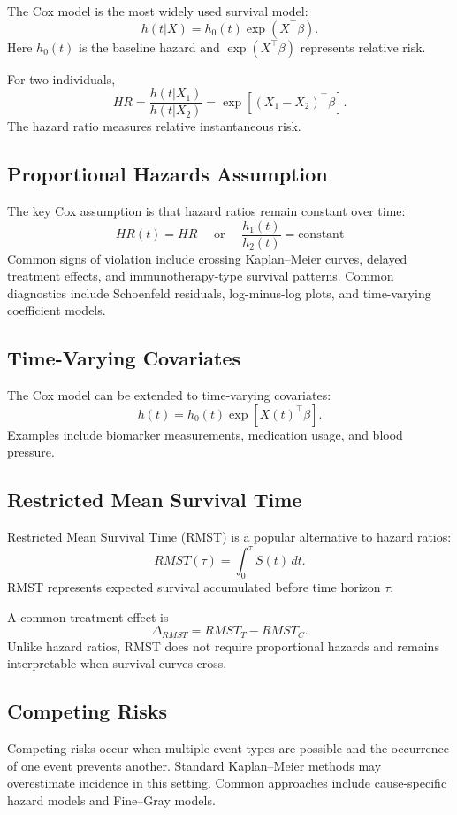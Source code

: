 \documentclass[11pt]{article}
\begin{document}
The Cox model is the most widely used survival model:
\[h(t|X)=h_0(t)\exp(X^\top\beta).\]
Here $h_0(t)$ is the baseline hazard and $\exp(X^\top\beta)$ represents relative risk.

For two individuals,\[HR=\frac{h(t|X_1)}{h(t|X_2)}=\exp[(X_1-X_2)^\top\beta].\]
The hazard ratio measures relative instantaneous risk.

\subsection*{Proportional Hazards Assumption}

The key Cox assumption is that hazard ratios remain constant over time: 
\[HR(t)=HR \quad \text{ or } \quad \frac{h_1(t)}{h_2(t)}=\text{constant}\]
Common signs of violation include crossing Kaplan--Meier curves, delayed treatment effects, and immunotherapy-type survival patterns. Common diagnostics include Schoenfeld residuals, log-minus-log plots, and time-varying coefficient models.

\subsection*{Time-Varying Covariates}

The Cox model can be extended to time-varying covariates:
\[h(t)=h_0(t)\exp[X(t)^\top\beta].\]
Examples include biomarker measurements, medication usage, and blood pressure.

\subsection*{Restricted Mean Survival Time}

Restricted Mean Survival Time (RMST) is a popular alternative to hazard ratios:
\[RMST(\tau)=\int_0^\tau S(t)\,dt.\]
RMST represents expected survival accumulated before time horizon $\tau$.

A common treatment effect is
\[\Delta_{RMST}=RMST_T-RMST_C.\]
Unlike hazard ratios, RMST does not require proportional hazards and remains interpretable when survival curves cross.

\subsection*{Competing Risks}

Competing risks occur when multiple event types are possible and the occurrence of one event prevents another.
Standard Kaplan--Meier methods may overestimate incidence in this setting.
Common approaches include cause-specific hazard models and Fine--Gray models.
\end{document}
